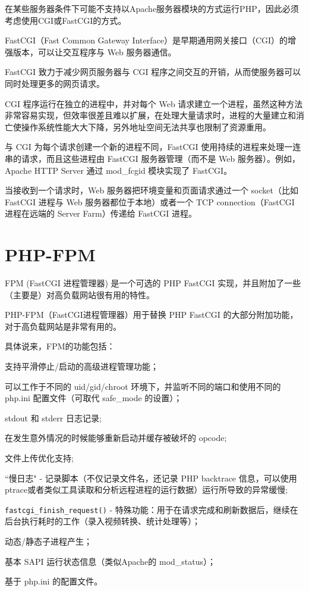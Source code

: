 在某些服务器条件下可能不支持以Apache服务器模块的方式运行PHP，因此必须考虑使用CGI或FastCGI的方式。


FastCGI（Fast Common Gateway Interface）是早期通用网关接口（CGI）的增强版本，可以让交互程序与 Web 服务器通信。

FastCGI 致力于减少网页服务器与 CGI 程序之间交互的开销，从而使服务器可以同时处理更多的网页请求。

CGI 程序运行在独立的进程中，并对每个 Web 请求建立一个进程，虽然这种方法非常容易实现，但效率很差且难以扩展，在处理大量请求时，进程的大量建立和消亡使操作系统性能大大下降，另外地址空间无法共享也限制了资源重用。

与 CGI 为每个请求创建一个新的进程不同，FastCGI 使用持续的进程来处理一连串的请求，而且这些进程由 FastCGI 服务器管理（而不是 Web 服务器）。例如，Apache HTTP Server 通过 mod_fcgid 模块实现了 FastCGI。

当接收到一个请求时，Web 服务器把环境变量和页面请求通过一个 socket（比如FastCGI 进程与 Web 服务器都位于本地）或者一个 TCP connection（FastCGI 进程在远端的 Server Farm）传递给 FastCGI 进程。

\section{PHP-FPM}

FPM (FastCGI 进程管理器) 是一个可选的 PHP FastCGI 实现，并且附加了一些（主要是）对高负载网站很有用的特性。

PHP-FPM（FastCGI进程管理器）用于替换 PHP FastCGI 的大部分附加功能，对于高负载网站是非常有用的。

具体说来，FPM的功能包括：

\begin{compactitem}
\item 支持平滑停止/启动的高级进程管理功能；

\item 可以工作于不同的 uid/gid/chroot 环境下，并监听不同的端口和使用不同的 php.ini 配置文件（可取代 safe\_mode 的设置）；

\item stdout 和 stderr 日志记录;

\item 在发生意外情况的时候能够重新启动并缓存被破坏的 opcode;

\item 文件上传优化支持;

\item ``慢日志" - 记录脚本（不仅记录文件名，还记录 PHP backtrace 信息，可以使用 ptrace或者类似工具读取和分析远程进程的运行数据）运行所导致的异常缓慢;

\item \texttt{fastcgi\_finish\_request()} - 特殊功能：用于在请求完成和刷新数据后，继续在后台执行耗时的工作（录入视频转换、统计处理等）；

\item 动态/静态子进程产生；

\item 基本 SAPI 运行状态信息（类似Apache的 mod\_status）；

\item 基于 php.ini 的配置文件。

\end{compactitem}


